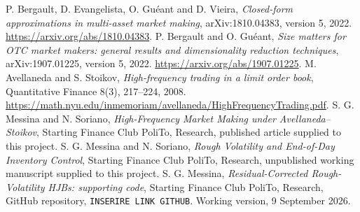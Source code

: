 \begin{references}
 P. Bergault, D. Evangelista, O. Gu\'eant and D. Vieira, \textit{Closed-form approximations in multi-asset market making}, arXiv:1810.04383, version 5, 2022. \url{https://arxiv.org/abs/1810.04383}.
 P. Bergault and O. Gu\'eant, \textit{Size matters for OTC market makers: general results and dimensionality reduction techniques}, arXiv:1907.01225, version 5, 2022. \url{https://arxiv.org/abs/1907.01225}.
 M. Avellaneda and S. Stoikov, \textit{High-frequency trading in a limit order book}, Quantitative Finance 8(3), 217--224, 2008. \url{https://math.nyu.edu/inmemoriam/avellaneda/HighFrequencyTrading.pdf}.
 S. G. Messina and N. Soriano, \textit{High-Frequency Market Making under Avellaneda--Stoikov}, Starting Finance Club PoliTo, Research, published article supplied to this project.
 S. G. Messina and N. Soriano, \textit{Rough Volatility and End-of-Day Inventory Control}, Starting Finance Club PoliTo, Research, unpublished working manuscript supplied to this project.
 S. G. Messina, \textit{Residual-Corrected Rough-Volatility HJBs: supporting code}, Starting Finance Club PoliTo, Research, GitHub repository, \texttt{INSERIRE LINK GITHUB}. Working version, 9 September 2026.
\end{references}


